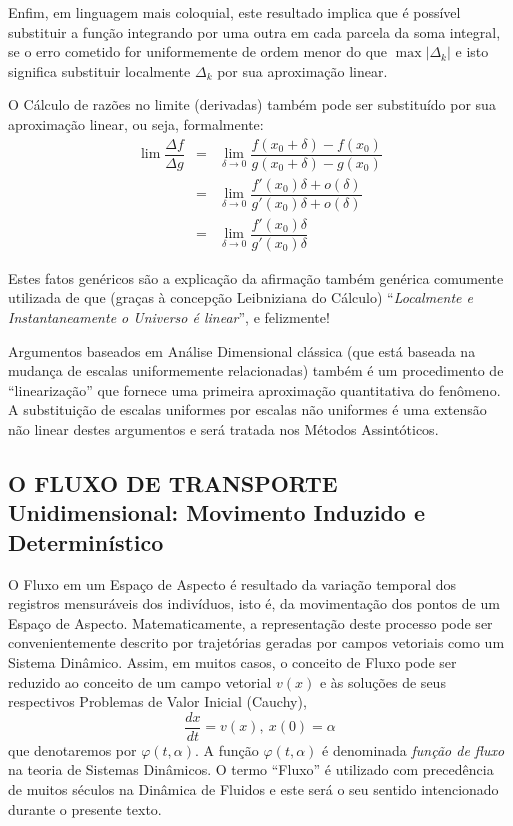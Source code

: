 {Enfim, em linguagem mais coloquial, este resultado implica que é possível substituir a função integrando por uma outra em cada parcela da soma integral, se o erro cometido for uniformemente de ordem menor do que \(\max|\Delta_k|\) e isto significa substituir localmente \(\Delta_k\) por sua aproximação linear.

O Cálculo de razões no limite (derivadas) também pode ser substituído por sua aproximação linear, ou seja, formalmente:
\[\begin{array}{rcl}
\displaystyle\lim \dfrac{\Delta f}{\Delta g} 
&=& \displaystyle \lim_{\delta \to 0} \dfrac{f(x_0+\delta)-f(x_0)}{g(x_0+\delta)-g(x_0)} \\[0.5cm]
&=& \displaystyle \lim_{\delta \to 0} \dfrac{f'(x_0) \delta + o(\delta)}{g'(x_0) \delta + o(\delta)} \\[0.5cm]
&=& \displaystyle \lim_{\delta \to 0} \dfrac{f'(x_0) \delta}{g'(x_0) \delta}
\end{array}\]


Estes fatos genéricos são a explicação da afirmação também genérica comumente utilizada de que (graças à concepção Leibniziana do Cálculo) ``\textit{Localmente e Instantaneamente o Universo é linear}'', e felizmente!

Argumentos baseados em Análise Dimensional clássica (que está baseada na mudança de escalas uniformemente relacionadas) também é um procedimento de ``linearização'' que fornece uma primeira aproximação quantitativa do fenômeno. A substituição de escalas uniformes por escalas não uniformes é uma extensão não linear destes argumentos e será tratada nos Métodos Assintóticos.
}


\subsection{O FLUXO DE TRANSPORTE Unidimensional: Movimento Induzido e Determinístico}

O Fluxo em um Espaço de Aspecto é resultado da variação temporal dos registros mensuráveis dos indivíduos, isto é, da movimentação dos pontos de um Espaço de Aspecto. Matematicamente, a representação deste processo pode ser convenientemente descrito por trajetórias geradas por campos vetoriais como um Sistema Dinâmico. Assim, em muitos casos, o conceito de Fluxo pode ser reduzido ao conceito de um campo vetorial \(v(x)\) e às soluções de seus respectivos Problemas de Valor Inicial (Cauchy),
\[
\dfrac{dx}{dt} = v(x),\ x(0) = \alpha
\]
que denotaremos por \(\varphi(t,\alpha)\). A função \(\varphi(t,\alpha)\) é denominada \textit{função de fluxo} na teoria de Sistemas Dinâmicos. O termo ``Fluxo'' é utilizado com precedência de muitos séculos na Dinâmica de Fluidos e este será o seu sentido intencionado durante o presente texto.

